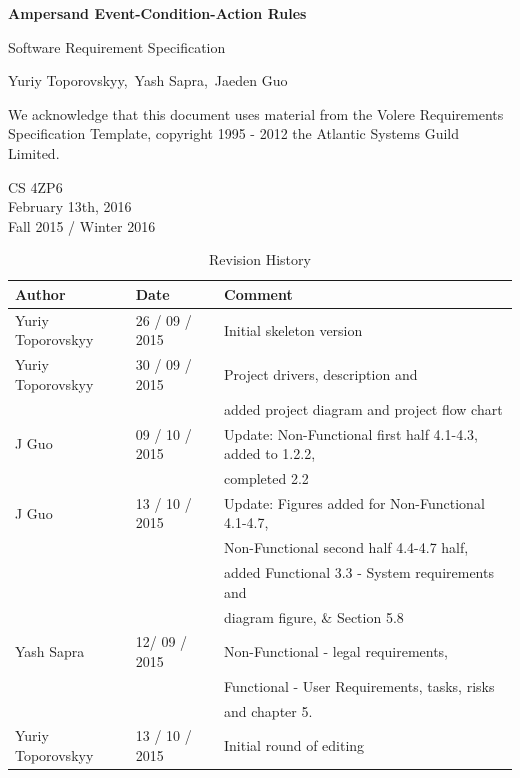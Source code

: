 \documentclass[12pt]{report}
\begin{document}
\begin{titlepage}\begin{center}
\thispagestyle{empty} %

\vspace*{1cm}

{\Huge\textbf{Ampersand Event-Condition-Action Rules}}

\vspace{0.5cm}
{\Large Software Requirement Specification 
	

\vspace{1.5cm}
Yuriy Toporovskyy,\ Yash Sapra,\ Jaeden Guo}
\vfill

We acknowledge that this document uses material from the Volere Requirements
Specification Template, copyright 1995 - 2012 the Atlantic Systems Guild
Limited.

\vspace{0.8cm}
\end{center}
CS 4ZP6 \\
February 13th, 2016 \\ 
Fall 2015 / Winter 2016 
\end{titlepage}


\begin{table}[ht!]\begin{center}
\caption{Revision History}  
\begin{tabular}{|l|l|l|}\hline
\textbf{Author} & \textbf{Date} & \textbf{Comment} \\\hline 
Yuriy Toporovskyy & 26 / 09 / 2015 & Initial skeleton version \\\hline
Yuriy Toporovskyy & 30 / 09 / 2015 & Project drivers, description and \\ & & 
added project diagram and project flow chart \\\hline
J Guo & 09 / 10 / 2015 & Update: Non-Functional first half 4.1-4.3, added to 
1.2.2, \\ & & completed 2.2 \\\hline
J Guo & 13 / 10 / 2015 & Update: Figures added for Non-Functional 4.1-4.7,  \\ 
& & 
Non-Functional second half 4.4-4.7 half, \\ & & added Functional 3.3 - System 
requirements  and \\ 
& & diagram figure, \& Section 5.8 \\\hline
Yash Sapra &  12/ 09 / 2015 & Non-Functional - legal requirements, \\ & & Functional - User 
Requirements, tasks, risks \\ & & and chapter 5.
\\\hline
Yuriy Toporovskyy & 13 / 10 / 2015 & Initial round of editing \\\hline
\end{tabular}
\end{center}\end{table}
\end{document}

